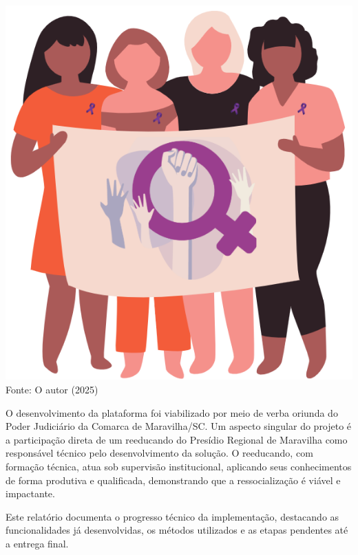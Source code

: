 \begin{minipage}[c]{0.4\textwidth}
  \includegraphics[width=\textwidth]{figure/logo_PIEVDCS.png}
  \label{figlogo_PIEVDCS}
  {\fontsize{10pt}{\baselineskip}\selectfont
    Fonte: O autor (2025)}
\end{minipage}

\par O desenvolvimento da plataforma foi viabilizado por meio de verba oriunda do Poder Judiciário da Comarca de Maravilha/SC. Um aspecto singular do projeto é a participação direta de um reeducando do Presídio Regional de Maravilha como responsável técnico pelo desenvolvimento da solução. O reeducando, com formação técnica, atua sob supervisão institucional, aplicando seus conhecimentos de forma produtiva e qualificada, demonstrando que a ressocialização é viável e impactante.

\par Este relatório documenta o progresso técnico da implementação, destacando as funcionalidades já desenvolvidas, os métodos utilizados e as etapas pendentes até a entrega final.

